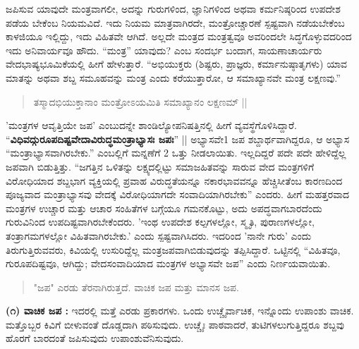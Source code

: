 ಜಪಿಸುವ ಯಾವುದೇ ಮಂತ್ರವಾಗಲೀ, ಅದನ್ನು ಗುರುಗಳಿಂದ, ಜ್ಞಾನಿಗಳಿಂದ ಅಥವಾ ಕರ್ಮನಿಷ್ಠರಿಂದ ಉಪದೇಶ ಪಡೆಯ ಬೇಕೆಂಬ ನಿಯಮವಿದೆ. ಇದು ನಿಯಮ ಮಾತ್ರವಾಗಿರದೇ, ಮಂತ್ರೋಚ್ಚಾರಣೆ ಸ್ಪಷ್ಟವಾಗಿ ನಡೆಯಬೇಕೆಂಬ ಕಾಳಜಿಯೂ ಇಲ್ಲಿದ್ದು, ಇದು ವಿಹಿತವೇ ಆಗಿದೆ. ಅಲ್ಲದೇ ಮಂತ್ರದ ಮಂತ್ರತ್ವವೂ ಅವರಿಂದಲೇ ಸಿದ್ಧಗೊಳ್ಳುವದರಿಂದ ಇದು ಅನಿವಾರ್ಯವೂ ಹೌದು. “ಮಂತ್ರ” ಯಾವುದು? ಎಂಬ ಸಂದರ್ಭ ಬಂದಾಗ, ಸಾಯಣಾಚಾರ್ಯರು ವೇದಭಾಷ್ಯಭೂಮಿಕೆಯಲ್ಲಿ ಹೀಗೆ ಹೇಳುತ್ತಾರೆ. “ಅಭಿಯುಕ್ತರು (ಶಿಷ್ಟರು, ಪ್ರಾಜ್ಞರು, ಕರ್ಮಾನುಷ್ಠಾತೃಗಳು) ಯಾವ ಮಾತನ್ನು ಅಥವಾ ಶಬ್ದ ಸಮೂಹವನ್ನು ಮಂತ್ರ ಎಂದು ಕರೆಯುತ್ತಾರೋ, ಆ ಸಮಾಖ್ಯಾನವೇ ಮಂತ್ರ ಲಕ್ಷಣವು.” 
\begin{verse}
ತಸ್ಮಾದಭಿಯುಕ್ತಾನಾಂ ಮಂತ್ರೋಽಯಮಿತಿ ಸಮಾಖ್ಯಾನಂ ಲಕ್ಷಣಮ್ ||
\end{verse}
’ಮಂತ್ರಗಳ ಆವೃತ್ತಿಯೇ ಜಪ’ ಎಂಬುದನ್ನೇ ಶಾಂಡಿಲ್ಯೋಪನಿಷತ್ತಿನಲ್ಲಿ ಹೀಗೆ ವ್ಯವಸ್ಥೆಗೊಳಿಸಿದ್ದಾರೆ. “\textbf{ವಿಧಿವದ್ಗುರೂಪದಿಷ್ಟವೇದಾವಿರುದ್ಧಮಂತ್ರಾಭ್ಯಾಸಃ ಜಪಃ}” || ಅಭ್ಯಾಸವೇ1 ಜಪ ಶಬ್ದಾರ್ಥವಾಗಿದ್ದರೂ, ಆ ಅಭ್ಯಾಸ “ಮಂತ್ರಾಭ್ಯಾಸವಾಗಿರಬೇಕು.” ಎಂಬಲ್ಲಿಗೆ ಮನ್ನಣೆಗೆ 2 ಒತ್ತು ನೀಡಲಾಯಿತು. ಇಲ್ಲದಿದ್ದರೆ ಪದೇ ಪದೇ ಹೇಳಿದ್ದೆಲ್ಲ ಜಪವಾಗಿ ಬಿಡುತ್ತಿತ್ತು. “ಜಗತ್ತಿನ ಒಳಿತನ್ನು ಲಕ್ಷ್ಯದಲ್ಲಿಟ್ಟು ಸಮಾಜಹಿತವನ್ನು ಸಾರುವ ವೇದ ಮಂತ್ರಗಳಿಗೆ ವಿರೋಧಿಯಾದ ಶಬ್ದಭಾಗ ವ್ಯಕ್ತಿಯಲ್ಲಿ ಪ್ರವಾಹ ವಿರುದ್ಧತೆಯನ್ನೂ ನಕಾರಭಾವವನ್ನೂ ಹೆಚ್ಚಿಸೀತೆಂಬ ಕಾರಣದಿಂದ ಪೂಜ್ಯವಾದ ಮಂತ್ರಾಭ್ಯಾಸವು ವೇದಕ್ಕೆ ವಿರೋಧಿಯಾಗದೇ ಸಂವಾದಿಯಾಗಿರಬೇಕು” ಎಂದರು. ಹೀಗೆ ಮಹತ್ತರವಾದ ಮಂತ್ರಗಳ ಉಚ್ಚಾರ ಮತ್ತು ಆಚಾರ ಸಂಹಿತೆಗಳ ಬಗ್ಗೆಯೂ ಗಮನಕೊಟ್ಟು, ಅದು ಅಪದ್ಧವಾಗಬಾರದೆಂದು ಗುರುವಿನಿಂದ ಉಪದಿಷ್ಟವಾಗಿರಬೇಕೆಂದರು. ’ಇಂಥ ಉಪದೇಶ ಕಲ್ಪಗಳಲ್ಲೋ, ಸ್ಮೃತಿ, ಪುರಾಣಗಳಲ್ಲೋ, ತಂತ್ರಾಗಮಗಳಲ್ಲೋ ವಿಹಿತವಾಗಿರಬೇಕು.’ ಎಂದು ಸ್ಪಷ್ಟವಾಗಿಸಿದರು. ಇದರಿಂದ ’ನಾನೇ ಗುರು’ ಎಂದು ತಿರುಗುತ್ತಿರುವವರು, ಕಿವಿಯಲ್ಲಿ ಉಸುರಿದ್ದೆಲ್ಲ ಮಂತ್ರಜಪವಾಗಿಬಿಡುವುದನ್ನು ತಪ್ಪಿಸಿದ್ದಾರೆ. ಒಟ್ಟಿನಲ್ಲಿ “ವಿಹಿತವೂ, ಗುರೂಪದಿಷ್ಟವೂ, ಆಗಿದ್ದು; ವೇದಸಂವಾದಿಯಾದ ಮಂತ್ರಗಳ ಅಭ್ಯಾಸವೇ ಜಪ” ಎಂದು ನಿರ್ಣಯವಾಯಿತು.
\begin{verse}
"ಜಪ" ಎರಡು ತೆರನಾಗಿರುತ್ತದೆ. ವಾಚಿಕ ಜಪ ಮತ್ತು ಮಾನಸ ಜಪ.
\end{verse}
\textbf{(೧) ವಾಚಿಕ ಜಪ :} ಇದರಲ್ಲಿ ಮತ್ತೆ ಎರಡು ಪ್ರಕಾರಗಳು. ಒಂದು ಉಚ್ಚೈರ್ವಾಚಿಕ, ಇನ್ನೊಂದು ಉಪಾಂಶು ವಾಚಿಕ. ಮತ್ತೊಬ್ಬರ ಕಿವಿಗೆ ಬೀಳುವಂತೆ ದೊಡ್ಡದಾಗಿ ಪಠಿಸುವುದು. ಉಚ್ಚೈಃ ಪಾಠವಾದರೆ, ತುಟಿಗಳಲುಗುತ್ತಿದ್ದರೂ ಶಬ್ದವು ಹೊರಗೆ ಬಾರದಂತೆ ಜಪಿಸುವುದು ಉಪಾಂಶುವೆನಿಸುವುದು.

